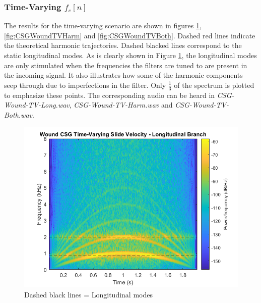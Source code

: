 \documentclass[../main.tex]{subfiles}
\begin{document}
\subsubsection{Time-Varying $f_c[n]$}
The results for the time-varying scenario are shown in figures \ref{fig:CSGWoundTVLong}, \ref{fig:CSGWoundTVHarm} and \ref{fig:CSGWoundTVBoth}. Dashed red lines indicate the theoretical harmonic trajectories. Dashed blacked lines correspond to the static longitudinal modes. As is clearly shown in Figure \ref{fig:CSGWoundTVLong}, the longitudinal modes are only stimulated when the frequencies the filters are tuned to are present in the incoming signal. It also illustrates how some of the harmonic components seep through due to imperfections in the filter. Only $\frac{1}{3}$ of the spectrum is plotted to emphasize these points. The corresponding audio can be heard in \emph{CSG-Wound-TV-Long.wav}, \emph{CSG-Wound-TV-Harm.wav} and \emph{CSG-Wound-TV-Both.wav}.

\begin{figure}[h]
    \centering
    \includegraphics[scale=.65]{./images/plots/CSG_Wound_TV_Long.png}
    \caption{Dashed black lines = Longitudinal modes}
    \label{fig:CSGWoundTVLong}
\end{figure}
\end{document}
